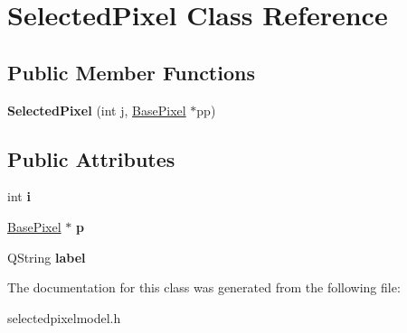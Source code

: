 \hypertarget{classSelectedPixel}{
\section{SelectedPixel Class Reference}
\label{classSelectedPixel}
}
\subsection*{Public Member Functions}
\begin{DoxyCompactItemize}
\item 
\hypertarget{classSelectedPixel_a7fcbf93f5923c874653947c771259687}{
{\bfseries SelectedPixel} (int j, \hyperlink{classBasePixel}{BasePixel} $\ast$pp)}
\label{classSelectedPixel_a7fcbf93f5923c874653947c771259687}

\end{DoxyCompactItemize}
\subsection*{Public Attributes}
\begin{DoxyCompactItemize}
\item 
\hypertarget{classSelectedPixel_ab1f13f5c295bada8d45431066f35a49e}{
int {\bfseries i}}
\label{classSelectedPixel_ab1f13f5c295bada8d45431066f35a49e}

\item 
\hypertarget{classSelectedPixel_a87b3e00290890ff3b42d57e5eb900725}{
\hyperlink{classBasePixel}{BasePixel} $\ast$ {\bfseries p}}
\label{classSelectedPixel_a87b3e00290890ff3b42d57e5eb900725}

\item 
\hypertarget{classSelectedPixel_a440fe71dd3e04628681c96988e4f5e61}{
QString {\bfseries label}}
\label{classSelectedPixel_a440fe71dd3e04628681c96988e4f5e61}

\end{DoxyCompactItemize}


The documentation for this class was generated from the following file:\begin{DoxyCompactItemize}
\item 
selectedpixelmodel.h\end{DoxyCompactItemize}
